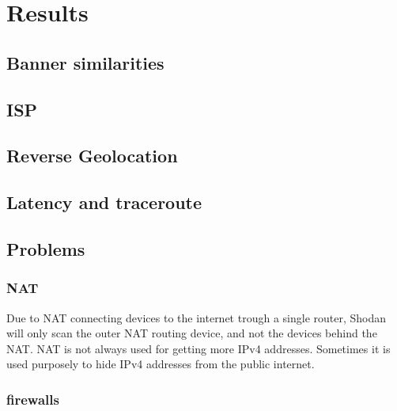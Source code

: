 \section{Results}
\subsection{Banner similarities}
\subsection{ISP}
\subsection{Reverse Geolocation}
\subsection{Latency and traceroute}
\subsection{Problems}
\subsubsection{NAT}
Due to NAT connecting devices to the internet trough a single router, Shodan will only scan the outer NAT routing device, and not the devices behind the NAT. NAT is not always used for getting more IPv4 addresses. Sometimes it is used purposely to hide IPv4 addresses from the public internet.

\subsubsection{firewalls}


